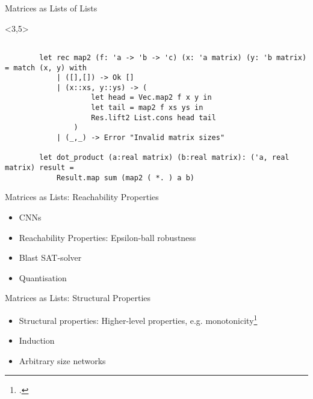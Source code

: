 \documentclass[handout]{beamer}
\begin{document}
\begin{frame}[fragile]{Matrices as Lists of Lists}

	


	\begin{onlyenv}<3,5>
	\begin{lstlisting}
		
		let rec map2 (f: 'a -> 'b -> 'c) (x: 'a matrix) (y: 'b matrix) = match (x, y) with
			| ([],[]) -> Ok []
			| (x::xs, y::ys) -> (
					let head = Vec.map2 f x y in
					let tail = map2 f xs ys in
					Res.lift2 List.cons head tail
				)
			| (_,_) -> Error "Invalid matrix sizes"
		
		let dot_product (a:real matrix) (b:real matrix): ('a, real matrix) result =
			Result.map sum (map2 ( *. ) a b)
	\end{lstlisting}
	\end{onlyenv}

\end{frame}



\begin{frame}[fragile]{Matrices as Lists: Reachability Properties}
	\begin{itemize}
	\item<1->{CNNs}

	\item<2->{Reachability Properties: Epsilon-ball robustness}
	
	\item<3->{Blast SAT-solver}

	\item<4->{Quantisation}
	\end{itemize}
\end{frame}


\begin{frame}{Matrices as Lists: Structural Properties}
	\begin{itemize}
		
	\item<1->{Structural properties: Higher-level properties, e.g. monotonicity\footcite{de_maria_use_2021}}
	
	\item<1->Induction
	
	\item<3->Arbitrary size networks
	\end{itemize}
\end{frame}
\end{document}
